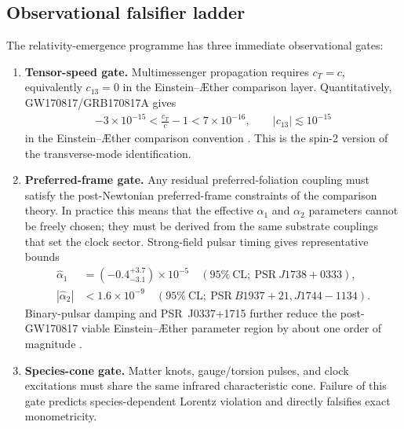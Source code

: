 \subsection{Observational falsifier ladder}

The relativity-emergence programme has three immediate observational gates:
\begin{enumerate}
    \item \textbf{Tensor-speed gate.} Multimessenger propagation requires
    \(c_T=c\), equivalently \(c_{13}=0\) in the Einstein--\AE ther comparison
    layer. Quantitatively, GW170817/GRB170817A gives
    \begin{align}
        -3\times10^{-15}
        <
        \frac{c_T}{c}-1
        <
        7\times10^{-16},
        \qquad
        |c_{13}|\lesssim10^{-15}
        \label{eq:rt_tensor_speed_observational_gate}
    \end{align}
    in the Einstein--\AE ther comparison convention \cite{LIGOVirgoFermiINTEGRAL2017,OostMukohyamaWang2018}.
    This is the spin-2 version of the transverse-mode identification.
    \item \textbf{Preferred-frame gate.} Any residual preferred-foliation
    coupling must satisfy the post-Newtonian preferred-frame constraints of
    the comparison theory. In practice this means that the effective
    \(\alpha_1\) and \(\alpha_2\) parameters cannot be freely chosen; they must
    be derived from the same substrate couplings that set the clock sector.
    Strong-field pulsar timing gives representative bounds
    \begin{align}
        \hat\alpha_1
        &=
        (-0.4^{+3.7}_{-3.1})\times10^{-5}
        \quad(95\%\ \mathrm{CL};\ \mathrm{PSR}\ J1738+0333),
        \\
        |\hat\alpha_2|
        &<
        1.6\times10^{-9}
        \quad(95\%\ \mathrm{CL};\ \mathrm{PSR}\ B1937+21,J1744-1134).
        \label{eq:rt_preferred_frame_observational_gate}
    \end{align}
    Binary-pulsar damping and PSR~J0337+1715 further reduce the post-GW170817
    viable Einstein--\AE ther parameter region by about one order of magnitude
    \cite{ShaoWex2012,ShaoCaballeroKramerWexChampionJessner2013,GuptaHerreroValeaBlasBarausseCornishYagiYunes2021}.
    \item \textbf{Species-cone gate.} Matter knots, gauge/torsion pulses, and
    clock excitations must share the same infrared characteristic cone. Failure
    of this gate predicts species-dependent Lorentz violation and directly
    falsifies exact monometricity.
\end{enumerate}

